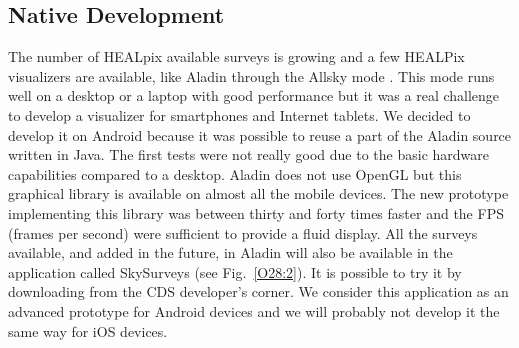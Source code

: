 \subsection{Native Development}
The number of HEALpix \citep{gorski_2005} available surveys is growing and a few HEALPix visualizers are available, like Aladin through the Allsky mode \citep{fernique_2010}. This mode runs well on a desktop or a laptop with good performance but it was a real challenge to develop a visualizer for smartphones and Internet tablets. We decided to develop it on Android because it was possible to reuse a part of the Aladin source written in Java. The first tests were not really good due to the basic hardware capabilities compared to a desktop. Aladin does not use OpenGL but this graphical library is available on almost all the mobile devices. The new prototype implementing this library was between thirty and forty times faster and the FPS (frames per second) were sufficient to provide a fluid display. All the surveys available, and added in the future, in Aladin will also be available in the application called SkySurveys (see Fig.~\ref{O28:2}). It is possible to try it by downloading from the CDS developer's corner. We consider this application as an advanced prototype for Android devices and we will probably not develop it the same way for iOS devices.


